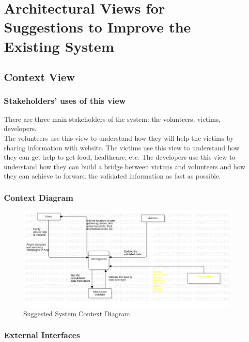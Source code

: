 \chapter{Architectural Views for Suggestions to Improve the Existing System}

\section{Context View}

\subsection{Stakeholders' uses of this view}

There are three main stakeholders of the system: the volunteers, victims, developers. \\

The volunteers use this view to understand how they will help the victims by sharing information with website.
The victims use this view to understand how they can get help to get food, healthcare, etc.
The developers use this view to understand how they can build a bridge between victims and volunteers and how they can achieve to forward the validated information as fast as possible.

\subsection{Context Diagram}

\begin{figure}[H]
    \includegraphics[scale = 0.5]{assets/System Context DiagramSuggestion.png}
    \caption[Suggested System Context Diagram]{Suggested System Context Diagram}
\end{figure}

\subsection{External Interfaces}

